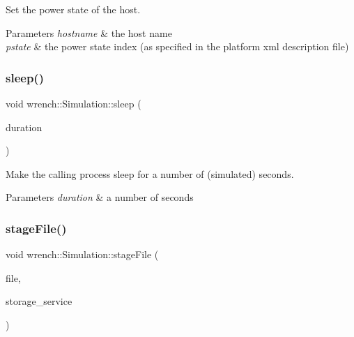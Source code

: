 Set the power state of the host. 


\begin{DoxyParams}{Parameters}
{\em hostname} & the host name \\
\hline
{\em pstate} & the power state index (as specified in the platform xml description file) \\
\hline
\end{DoxyParams}
\mbox{\label{classwrench_1_1_simulation_a04ced81e9eb97587a2affee4e7e210ef}} 
\subsubsection{\texorpdfstring{sleep()}{sleep()}}
{\footnotesize\ttfamily void wrench\+::\+Simulation\+::sleep (\begin{DoxyParamCaption}\item[{double}]{duration }\end{DoxyParamCaption})\hspace{0.3cm}{\ttfamily [static]}}



Make the calling process sleep for a number of (simulated) seconds. 


\begin{DoxyParams}{Parameters}
{\em duration} & a number of seconds \\
\hline
\end{DoxyParams}
\mbox{\label{classwrench_1_1_simulation_a493865392966728db4a2692d7aae9243}} 
\subsubsection{\texorpdfstring{stage\+File()}{stageFile()}\hspace{0.1cm}{\footnotesize\ttfamily [1/2]}}
{\footnotesize\ttfamily void wrench\+::\+Simulation\+::stage\+File (\begin{DoxyParamCaption}\item[{\hyperlink{classwrench_1_1_workflow_file}{Workflow\+File} $\ast$}]{file,  }\item[{\hyperlink{classwrench_1_1_storage_service}{Storage\+Service} $\ast$}]{storage\+\_\+service }\end{DoxyParamCaption})}



